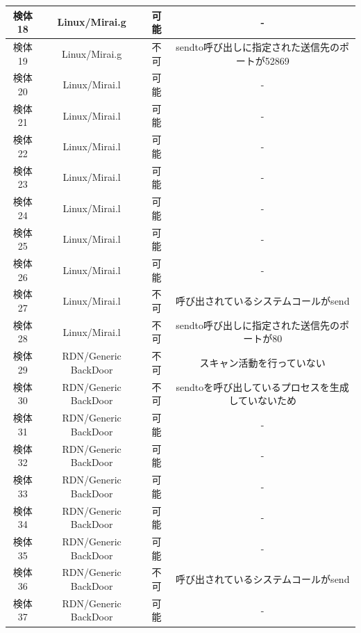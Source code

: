\begin{small}
\begin{flushleft}
\begin{longtable}{|c|c|c|c|}
        検体18 & Linux/Mirai.g        & 可能    & -                             \\ \hline
        検体19 & Linux/Mirai.g        & 不可    & sendto呼び出しに指定された送信先のポートが52869 \\ \hline
        検体20 & Linux/Mirai.l        & 可能    & -                             \\ \hline
        検体21 & Linux/Mirai.l        & 可能    & -                             \\ \hline
        検体22 & Linux/Mirai.l        & 可能    & -                             \\ \hline
        検体23 & Linux/Mirai.l        & 可能    & -                             \\ \hline
        検体24 & Linux/Mirai.l        & 可能    & -                             \\ \hline
        検体25 & Linux/Mirai.l        & 可能    & -                             \\ \hline
        検体26 & Linux/Mirai.l        & 可能    & -                             \\ \hline
        検体27 & Linux/Mirai.l        & 不可    & 呼び出されているシステムコールがsend       \\ \hline
        検体28 & Linux/Mirai.l        & 不可    & sendto呼び出しに指定された送信先のポートが80    \\ \hline
        検体29 & RDN/Generic BackDoor & 不可    & スキャン活動を行っていない                 \\ \hline
        検体30 & RDN/Generic BackDoor & 不可    & sendtoを呼び出しているプロセスを生成していないため  \\ \hline
        検体31 & RDN/Generic BackDoor & 可能    & -                             \\ \hline
        検体32 & RDN/Generic BackDoor & 可能    & -                             \\ \hline
        検体33 & RDN/Generic BackDoor & 可能    & -                             \\ \hline
        検体34 & RDN/Generic BackDoor & 可能    & -                             \\ \hline
        検体35 & RDN/Generic BackDoor & 可能    & -                             \\ \hline
        検体36 & RDN/Generic BackDoor & 不可    & 呼び出されているシステムコールがsend       \\ \hline
        検体37 & RDN/Generic BackDoor & 可能    & -                             \\ \hline

\end{longtable}
\end{flushleft}
\end{small}
